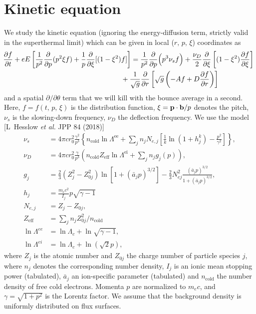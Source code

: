 \documentclass[11pt,a4paper]{article}
\newcommand{\sub}[1]{\ensuremath{_{\text{#1}}}}
\renewcommand{\b}[1]{\ensuremath{ {\bf #1 } }}
\begin{document}
\section{Kinetic equation}
We study the kinetic equation (ignoring the energy-diffusion term, strictly valid in the superthermal limit) which can be given in local ($r,\,p,\,\xi$) coordinates as 
\begin{align}
\hspace{-1mm}\frac{\partial f}{\partial t} + eE\left[\frac{1}{p^2}\frac{\partial}{\partial p}(p^2\xi f)  + \frac{1}{p}\frac{\partial}{\partial \xi}[(1-\xi^2) f]\right] &= \frac{1}{p^2}\frac{\partial}{\partial p}\Big(p^3 \nu_s  f\Big) + \frac{\nu_D}{2}\frac{\partial}{\partial \xi}\left[(1-\xi^2)\frac{\partial f}{\partial \xi}\right] \nonumber \\
&\hspace{-5mm} + \frac{1}{\sqrt{g}}\frac{\partial}{\partial r}\left[ \sqrt{g}\left( -Af+D\frac{\partial f}{\partial r}\right)\right]
\end{align}
and a spatial $\partial/\partial \theta$ term that we will kill with the bounce average in a second.
Here, $f=f(t,\,p,\,\xi)$ is the distribution function, $\xi = \b{p}\cdot\b{b}/p$ denotes the pitch, $\nu_s$ is the slowing-down frequency, $\nu_D$ the deflection frequency. We use the model [L~Hesslow \emph{et al.} JPP 84 (2018)]
\begin{align}
\nu_s &= 4\pi c r_0^2 \frac{\gamma^2}{p^3} \left\{n\sub{cold} \ln\Lambda^\text{ee} + \sum_j n_j N_{e,j}\left[\frac{1}{k}\ln(1+ h_j^k)  - \frac{p^2}{\gamma^2}\right]\right\} , \nonumber \\
\nu_D &= 4\pi c r_0^2\frac{\gamma}{p^3} \left( n\sub{cold} Z\sub{eff} \ln\Lambda^\text{ei} + \sum_j n_j g_j(p) \right), \nonumber \\
g_j &= \frac{2}{3} (Z_j^2-Z_{0j}^2)\ln[1+ (\bar{a}_jp)^{3/2}] - \frac{2}{3}N_{ej}^2\frac{(\bar{a}_j p)^{3/2}}{1+(\bar{a}_j p)^{3/2}}, \nonumber \\
h_j &= \frac{m_e c^2}{I_j}p\sqrt{\gamma-1}\nonumber \\
N_{e,j} &= Z_j-Z_{0j}, \nonumber \\
Z\sub{eff} &= \sum_j n_j Z_{0j}^2/n\sub{cold}  \nonumber \\
\ln\Lambda^{ee} &= \ln\Lambda_c + \ln\sqrt{\gamma-1}, \nonumber \\
\ln\Lambda^{ei} &= \ln\Lambda_c + \ln(\sqrt{2}p), 
\end{align}
where $Z_j$ is the atomic number and $Z_{0j}$ the charge number of particle species $j$, where $n_j$ denotes the corresponding number density, $I_j$ is an ionic mean stopping power (tabulated), $\bar{a}_j$ an ion-specific parameter (tabulated) and $n\sub{cold}$ the number density of free cold electrons. Momenta $p$ are normalized to $m_e c$, and $\gamma = \sqrt{1+p^2}$ is the Lorentz factor. We assume that the background density is uniformly distributed on flux surfaces.
\end{document}
